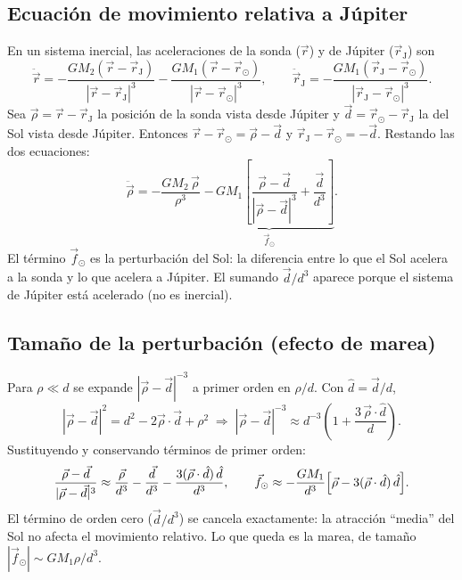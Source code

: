 \documentclass[12pt,letterpaper]{article}
\begin{document}
\subsection{Ecuación de movimiento relativa a Júpiter}

En un sistema inercial, las aceleraciones de la sonda ($\vec r$) y de Júpiter ($\vec r_{\mathrm J}$)
son
\[
\ddot{\vec r} = -\frac{GM_2(\vec r - \vec r_{\mathrm J})}{|\vec r - \vec r_{\mathrm J}|^3}
               - \frac{GM_1(\vec r - \vec r_\odot)}{|\vec r - \vec r_\odot|^3},
\qquad
\ddot{\vec r}_{\mathrm J} = -\frac{GM_1(\vec r_{\mathrm J} - \vec r_\odot)}{|\vec r_{\mathrm J} - \vec r_\odot|^3}.
\]
Sea $\vec\rho = \vec r - \vec r_{\mathrm J}$ la posición de la sonda vista desde Júpiter y
$\vec d = \vec r_\odot - \vec r_{\mathrm J}$ la del Sol vista desde Júpiter. Entonces
$\vec r - \vec r_\odot = \vec\rho - \vec d$ y $\vec r_{\mathrm J} - \vec r_\odot = -\vec d$.
Restando las dos ecuaciones:
\begin{equation}
\ddot{\vec\rho} = -\frac{GM_2\,\vec\rho}{\rho^3}
\;\underbrace{-\,GM_1\left[\frac{\vec\rho - \vec d}{|\vec\rho - \vec d|^3} + \frac{\vec d}{d^3}\right]}_{\vec f_\odot}.
\label{eq:jov}
\end{equation}
El término $\vec f_\odot$ es la perturbación del Sol: la diferencia entre lo que el Sol acelera a
la sonda y lo que acelera a Júpiter. El sumando $\vec d/d^3$ aparece porque el sistema de
Júpiter está acelerado (no es inercial).

\subsection{Tamaño de la perturbación (efecto de marea)}

Para $\rho\ll d$ se expande $|\vec\rho-\vec d|^{-3}$ a primer orden en $\rho/d$. Con
$\hat d = \vec d/d$,
\[
|\vec\rho - \vec d|^2 = d^2 - 2\vec\rho\cdot\vec d + \rho^2
\;\Longrightarrow\;
|\vec\rho - \vec d|^{-3} \approx d^{-3}\left(1 + \frac{3\,\vec\rho\cdot\hat d}{d}\right).
\]
Sustituyendo y conservando términos de primer orden:
\[
\frac{\vec\rho - \vec d}{|\vec\rho - \vec d|^3} \approx \frac{\vec\rho}{d^3} - \frac{\vec d}{d^3}
- \frac{3(\vec\rho\cdot\hat d)\,\hat d}{d^3},
\qquad
\vec f_\odot \approx -\frac{GM_1}{d^3}\Bigl[\vec\rho - 3(\vec\rho\cdot\hat d)\,\hat d\Bigr].
\]
El término de orden cero ($\vec d/d^3$) se cancela exactamente: la atracción ``media'' del Sol
no afecta el movimiento relativo. Lo que queda es la marea, de tamaño
$|\vec f_\odot| \sim GM_1\rho/d^3$.
\end{document}
